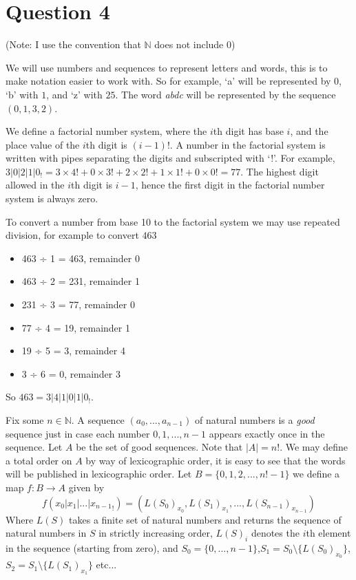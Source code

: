 \documentclass[11pt]{article}
\begin{document}
\section*{Question 4}
(Note: I use the convention that $\mathbb{N}$ does not include $0$)

We will use numbers and sequences to represent letters and words, this is to make notation easier to work with. So for example, `a' will be represented by $0$, `b' with $1$, and `z' with $25$. The word \textit{abdc} will be represented by the sequence $(0,1,3,2)$.

We define a factorial number system, where the $i$th digit has base $i$, and the place value of the $i$th digit is $(i-1)!$. A number in the factorial system is written with pipes separating the digits and subscripted with `!'. For example, $3|0|2|1|0_!=3\times4!+0\times3!+2\times2!+1\times1!+0\times0!=77$. The highest digit allowed in the $i$th digit is $i-1$, hence the first digit in the factorial number system is always zero.

To convert a number from base 10 to the factorial system we may use repeated division, for example to convert $463$
\begin{itemize}
	\item 463 ÷ 1 = 463, remainder 0
	\item 463 ÷ 2 = 231, remainder 1
	\item 231 ÷ 3 = 77, remainder 0
	\item 77 ÷ 4 = 19, remainder 1
	\item 19 ÷ 5 = 3, remainder 4
	\item 3 ÷ 6 = 0, remainder 3
\end{itemize}
So $463=3|4|1|0|1|0_!$. 

Fix some $n\in\mathbb{N}$. A sequence $(a_0,...,a_{n-1})$ of natural numbers is a \textit{good} sequence just in case each number $0, 1,...,n-1$ appears exactly once in the sequence. Let $A$ be the set of good sequences. Note that $|A|=n!$. We may define a total order on $A$ by way of lexicographic order, it is easy to see that the words will be published in lexicographic order. Let $B=\{0,1,2,...,n!-1\}$ we define a map $f:B\to A$ given by 
\[f(x_0|x_1|...|{x_{n-1}}_!)=(L(S_0)_{x_0},L(S_1)_{x_1},...,L(S_{n-1})_{x_{n-1}})\]
 Where $L(S)$ takes a finite set of natural numbers and returns the sequence of natural numbers in $S$ in strictly increasing order, $L(S)_i$ denotes the $i$th element in the sequence (starting from zero), and $S_0=\{0,...,n-1\}$,$S_1=S_0\setminus\{L(S_0)_{x_0}\}$, $S_2=S_1\setminus\{L(S_1)_{x_1}\}$ etc...
\end{document}
